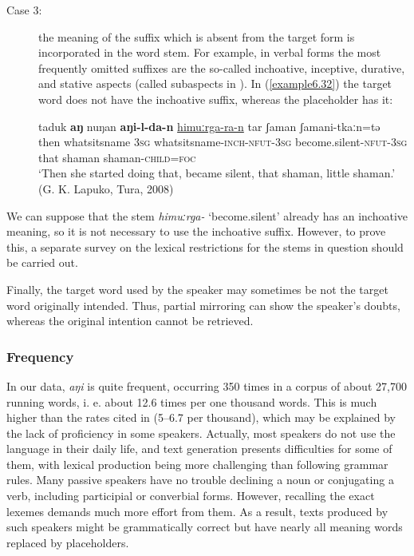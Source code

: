 \documentclass[output=paper,colorlinks,citecolor=brown]{langscibook}
\begin{document}
\begin{description}
  \item [Case 3:] the meaning of the suffix which is absent from the target form is incorporated in the word stem. For example, in verbal forms the most frequently omitted suffixes are the so-called inchoative, inceptive, durative, and stative aspects (called subaspects in \citealt[30]{BulatovaGrenoble1999}). In (\ref{example6.32}) the target word does not have the inchoative suffix, whereas the placeholder has it:

\ea
    \label{example6.32}
    \gll taduk	\textbf{aŋ}	nuŋan	\textbf{aŋi-l-da-n}  \uline{himuːrga-ra-n} 	tar 	ʃaman	ʃamani-tkaːn=tə\\
    then	whatsitsname	3\textsc{sg}	whatsitsname-\textsc{inch}-\textsc{nfut}-3\textsc{sg}  become.silent-\textsc{nfut}-3\textsc{sg} 	that 	shaman 	shaman-\textsc{child}=\textsc{foc}\\
    \glt `Then she started doing that, became silent, that shaman, little shaman.' (G. K. Lapuko, Tura, 2008)\\
    \z
\end{description}

We can suppose that the stem \textit{himuːrga-} ‘become.silent’ already has an inchoative meaning, so it is not necessary to use the inchoative suffix. However, to prove this, a separate survey on the lexical restrictions for the stems in question should be carried out.

Finally, the target word used by the speaker may sometimes be not the target word originally intended. Thus, partial mirroring can show the speaker’s doubts, whereas the original intention cannot be retrieved.


\subsubsection{Frequency}

In our data, \textit{aŋi} is quite frequent, occurring 350 times in a corpus of about 27,700 running words, i. e. about 12.6 times per one thousand words. This is much higher than the rates cited in \citet{Podlesskaya2010} (5–6.7 per thousand), which may be explained by the lack of proficiency in some speakers. Actually, most speakers do not use the  language in their daily life, and text generation presents difficulties for some of them, with lexical production being more challenging than following grammar rules. Many passive  speakers have no trouble declining a noun or conjugating a verb, including participial or converbial forms. However, recalling the exact lexemes demands much more effort from them. As a result, texts produced by such speakers might be grammatically correct but have nearly all meaning words replaced by placeholders.
\end{document}
